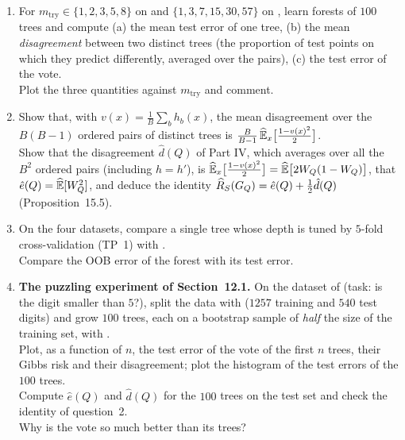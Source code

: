 \documentclass[a4paper,11pt]{article}
\begin{document}
\begin{enumerate}
\item For $m_{\text{try}}\in\{1,2,3,5,8\}$ on  and $\{1,3,7,15,30,57\}$ on , learn forests of
      $100$ trees and compute (a) the mean test error of one tree, (b) the mean \emph{disagreement} between two distinct
      trees (the proportion of test points on which they predict differently, averaged over the pairs), (c) the test error
      of the vote.\\
      Plot the three quantities against $m_{\text{try}}$ and comment.
\item Show that, with $v(x)=\frac1B\sum_bh_b(x)$, the mean disagreement over the $B(B-1)$ ordered pairs of distinct trees is
      $\frac{B}{B-1}\,\widehat{\mathbb{E}}_x\big[\frac{1-v(x)^2}{2}\big]$.\\
      Show that the disagreement $\hat d(Q)$ of Part IV, which averages over all the $B^2$ ordered pairs (including
      $h=h'$), is $\widehat{\mathbb{E}}_x\big[\frac{1-v(x)^2}{2}\big]=\widehat{\mathbb{E}}\big[2W_Q(1-W_Q)\big]$, that $\hat e(Q)=\widehat{\mathbb{E}}[W_Q^2]$, and deduce
      the identity $\widehat{R}_{S}(G_{Q})=\hat e(Q)+\frac12\hat d(Q)$ (Proposition~15.5).
\item On the four datasets, compare a single tree whose depth is tuned by $5$-fold cross-validation (TP~1) with
      .\\
      Compare the OOB error of the forest with
      its test error.
\item \textbf{The puzzling experiment of Section~12.1.} On the  dataset of  (task: is the
      digit smaller than $5$?), split the data with 
      ($1257$ training and $540$ test digits) and grow $100$ trees, each on a bootstrap sample of \emph{half} the size of the
      training set, with .\\
      Plot, as a function of $n$, the test error of the vote of the first $n$ trees, their Gibbs risk and their
      disagreement; plot the histogram of the test errors of the $100$ trees.\\
      Compute $\hat e(Q)$ and $\hat d(Q)$ for the $100$ trees on the test set and check the identity of question~2.\\
      Why is the vote so much better than its trees?
\end{enumerate}

\label{p2:far}
\end{document}
